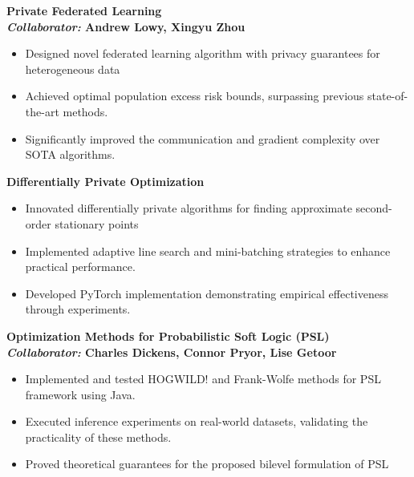 \documentclass[letterpaper,12pt]{article}
\newcommand{\resumeSubheadingTitleOnly}[1]{
  \vspace{-1pt}
\item
  \textbf{#1}
  \vspace{-5pt}
}
\begin{document}
\resumeSubheadingTitleOnly{Private Federated Learning \\
{\normalfont \textit{Collaborator:}} Andrew Lowy, Xingyu Zhou}
\begin{itemize}
  \item Designed novel federated learning algorithm with privacy guarantees for heterogeneous data
  \item Achieved optimal population excess risk bounds, surpassing previous state-of-the-art methods.
  \item Significantly improved the communication and gradient complexity over SOTA algorithms.
\end{itemize}

\resumeSubheadingTitleOnly{Differentially Private Optimization}
\begin{itemize}
  \item Innovated differentially private algorithms for finding approximate second-order stationary points
  \item Implemented adaptive line search and mini-batching strategies to enhance practical performance.
  \item Developed PyTorch implementation demonstrating empirical effectiveness through experiments.
\end{itemize}


\resumeSubheadingTitleOnly{Optimization Methods for Probabilistic Soft Logic (PSL) \\
{\normalfont \textit{Collaborator:}} Charles Dickens, Connor Pryor, Lise Getoor}
\begin{itemize}
  \item Implemented and tested HOGWILD! and Frank-Wolfe methods for PSL framework using Java.
  \item Executed inference experiments on real-world datasets, validating the practicality of these methods.
  \item Proved theoretical guarantees for the proposed bilevel formulation of PSL
\end{itemize}
\end{document}
